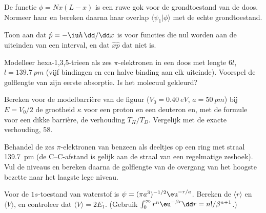 \begin{exercise}[$\star\star$]\label{exo:b3:quantum-model-systems:7}
De functie $\phi = Nx(L - x)$ is een ruwe gok voor de grondtoestand van de
doos. Normeer haar en bereken daarna haar overlap $\langle\psi_1|\phi\rangle$ met
de echte grondtoestand.
\end{exercise}

\begin{exercise}[$\star\star$]\label{exo:b3:quantum-model-systems:8}
Toon aan dat $\hat p = -\iu\hbar\,\dd/\dd x$  is voor functies die
nul worden aan de uiteinden van een interval, en dat $\hat x\hat p$ dat niet is.
\end{exercise}

\begin{exercise}[$\star\star$]\label{exo:b3:quantum-model-systems:9}
Modelleer hexa-1,3,5-trieen als zes $\pi$-elektronen in een doos met
lengte $6l$, $l =
\qty{139.7}{pm}$ (vijf bindingen en een halve binding aan elk uiteinde).
Voorspel de golflengte van zijn eerste absorptie. Is het molecuul gekleurd?
\end{exercise}

\begin{exercise}[$\star\star\star$]\label{exo:b3:quantum-model-systems:10}
Bereken voor de modelbarrière van de figuur ($V_0 = \qty{0.40}{eV}$, $a = \qty{50}{pm}$)
bij $E = V_0/2$ de grootheid $\kappa$ voor een proton en een deuteron en,
met de formule voor een dikke barrière, de verhouding $T_H/T_D$. Vergelijk
met de exacte verhouding, 58.
\end{exercise}

\begin{exercise}[$\star\star\star$]\label{exo:b3:quantum-model-systems:11}
Behandel de zes $\pi$-elektronen van benzeen als deeltjes op een ring met
straal
\qty{139.7}{pm} (de C--C-afstand is gelijk aan de straal van een regelmatige
zeshoek). Vul de niveaus en bereken daarna de golflengte van de overgang
van het hoogste bezette naar het laagste lege niveau.
\end{exercise}

\begin{exercise}[$\star\star\star$]\label{exo:b3:quantum-model-systems:12}
Voor de $1s$-toestand van waterstof is $\psi = (\pi a^3)^{-1/2}\eu^{-r/a}$.
Bereken de  $\langle r\rangle$ en $\langle V\rangle$, en
controleer dat
$\langle V\rangle = 2E_1$. (Gebruik $\int_0^\infty r^n\eu^{-\beta r}\dd r =
n!/\beta^{n+1}$.)
\end{exercise}

